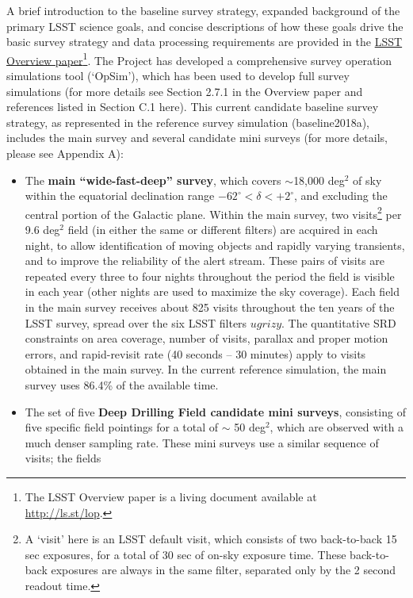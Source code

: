 \documentclass[DM,toc,usenatbib]{lsstdoc}
\begin{document}
A brief introduction to the baseline survey strategy, expanded background of the primary LSST science 
goals, and concise descriptions of how these goals drive the basic survey strategy and data processing
requirements are provided in the \href{http://ls.st/lop}{LSST Overview paper}\footnote{The LSST Overview 
paper is a living document available at \href{http://ls.st/lop}{http://ls.st/lop}.}. The Project has developed
a comprehensive survey operation simulations tool (`OpSim'), which has been used to develop
full survey simulations (for more details see Section 2.7.1 in the Overview paper and references listed
in Section C.1 here). 
This current candidate baseline survey strategy, as represented in the reference survey simulation (baseline2018a), 
includes the main survey and several candidate mini surveys (for more details, please see Appendix A): 
\begin{itemize}
\item The {\bf main ``wide-fast-deep'' survey}, which covers $\sim$18,000 deg$^2$ of sky within
the equatorial declination
range $-62^\circ < \delta < +2^\circ$, and excluding the central portion of the Galactic 
plane. Within the main survey, two visits\footnote{A `visit' here is an LSST default visit, which 
consists of two back-to-back 15 sec exposures, for a total of 30 sec of on-sky exposure time. These back-to-back exposures are always
in the same filter, separated only by the 2 second readout time.} 
per 9.6 deg$^2$ field (in either the same or different filters) are acquired in each night, to allow identification of moving objects and rapidly varying transients, and to improve
the reliability of the alert stream. These pairs of visits are repeated every three to four nights throughout the period the field is visible in each year (other nights are used to maximize the sky coverage). Each
field in the main survey receives about 825 visits throughout the ten years of the LSST survey, spread over the six LSST filters 
$ugrizy$. The quantitative SRD constraints on area coverage, number of visits, parallax and proper motion errors, and 
rapid-revisit rate (40 seconds -- 30 minutes) apply to visits obtained in the main survey. 
In the current reference simulation, the main survey uses 86.4\% of the available time.
\item The set of five {\bf Deep Drilling Field candidate mini surveys}, consisting of five specific field pointings for a total of $\sim$ 50 deg$^2$, 
which are observed with a much denser sampling rate. These mini surveys use a similar sequence of visits; the fields

\end{itemize}
\end{document}
